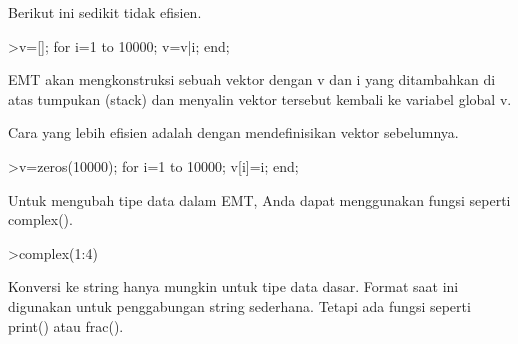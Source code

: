 \documentclass[12pt,arial,letterpaper]{book}
\begin{document}
\begin{eulercomment}
\begin{eulercomment}
\begin{eulercomment}
\begin{eulercomment}
\begin{eulercomment}
\begin{eulercomment}
\begin{eulercomment}
\begin{eulercomment}
\begin{eulercomment}
\begin{eulercomment}
\begin{eulercomment}
\begin{eulercomment}
\begin{eulercomment}
\begin{eulercomment}
\begin{eulercomment}
\begin{eulercomment}
\begin{eulercomment}
\begin{eulercomment}
\begin{eulercomment}
\begin{eulercomment}
\begin{eulercomment}
\begin{eulercomment}
\begin{eulercomment}
\begin{eulercomment}
\begin{eulercomment}
\begin{eulercomment}
\begin{eulercomment}
\begin{eulercomment}
\begin{eulercomment}
\begin{eulercomment}
\begin{eulercomment}
\begin{eulercomment}
\begin{eulercomment}
\begin{eulercomment}
\begin{eulercomment}
\begin{eulercomment}
\begin{eulercomment}
Berikut ini sedikit tidak efisien.
\end{eulercomment}
\begin{eulerprompt}
>v=[]; for i=1 to 10000; v=v|i; end;
\end{eulerprompt}
\begin{eulercomment}
EMT akan mengkonstruksi sebuah vektor dengan v dan i yang ditambahkan
di atas tumpukan (stack) dan menyalin vektor tersebut kembali ke
variabel global v.

Cara yang lebih efisien adalah dengan mendefinisikan vektor
sebelumnya.
\end{eulercomment}
\begin{eulerprompt}
>v=zeros(10000); for i=1 to 10000; v[i]=i; end;
\end{eulerprompt}
\begin{eulercomment}
Untuk mengubah tipe data dalam EMT, Anda dapat menggunakan fungsi
seperti complex().
\end{eulercomment}
\begin{eulerprompt}
>complex(1:4)
\end{eulerprompt}
\begin{euleroutput}
  [ 1+0i ,  2+0i ,  3+0i ,  4+0i  ]
\end{euleroutput}
\begin{eulercomment}
Konversi ke string hanya mungkin untuk tipe data dasar. Format saat
ini digunakan untuk penggabungan string sederhana. Tetapi ada fungsi
seperti print() atau frac().


\end{eulercomment}
\end{eulercomment}
\end{eulercomment}
\end{eulercomment}
\end{eulercomment}
\end{eulercomment}
\end{eulercomment}
\end{eulercomment}
\end{eulercomment}
\end{eulercomment}
\end{eulercomment}
\end{eulercomment}
\end{eulercomment}
\end{eulercomment}
\end{eulercomment}
\end{eulercomment}
\end{eulercomment}
\end{eulercomment}
\end{eulercomment}
\end{eulercomment}
\end{eulercomment}
\end{eulercomment}
\end{eulercomment}
\end{eulercomment}
\end{eulercomment}
\end{eulercomment}
\end{eulercomment}
\end{eulercomment}
\end{eulercomment}
\end{eulercomment}
\end{eulercomment}
\end{eulercomment}
\end{eulercomment}
\end{eulercomment}
\end{eulercomment}
\end{eulercomment}
\end{eulercomment}
\end{document}
